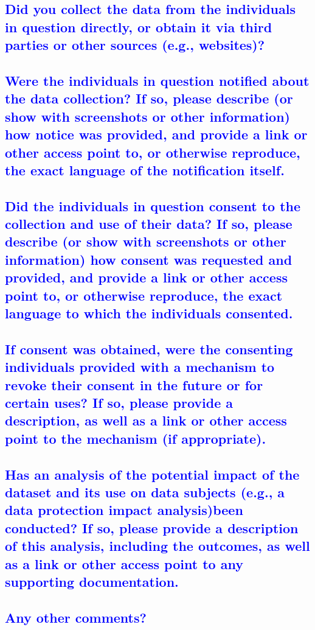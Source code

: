 \documentclass[letterpaper, 10 pt, conference]{ieeeconf}  %
\begin{document}
\textcolor{blue}{\subsection{Did you collect the data from the individuals in question directly, or
obtain it via third parties or other sources (e.g., websites)?}}
\lipsum[1]

\textcolor{blue}{\subsection{Were the individuals in question notified about the data collection?
If so, please describe (or show with screenshots or other information) how
notice was provided, and provide a link or other access point to, or otherwise reproduce, the exact language of the notification itself.}}
\lipsum[1]

\textcolor{blue}{\subsection{Did the individuals in question consent to the collection and use of
their data? If so, please describe (or show with screenshots or other
information) how consent was requested and provided, and provide a link
or other access point to, or otherwise reproduce, the exact language to
which the individuals consented.}}
\lipsum[1]

\textcolor{blue}{\subsection{If consent was obtained, were the consenting individuals provided
with a mechanism to revoke their consent in the future or for certain
uses? If so, please provide a description, as well as a link or other access
point to the mechanism (if appropriate).}}
\lipsum[1]

\textcolor{blue}{\subsection{Has an analysis of the potential impact of the dataset and its use
on data subjects (e.g., a data protection impact analysis)been conducted? If so, please provide a description of this analysis, including the
outcomes, as well as a link or other access point to any supporting documentation.}}
\lipsum[1]

\textcolor{blue}{\subsection{Any other comments?}}
\lipsum[1]

\medskip
 
  

\end{document}
